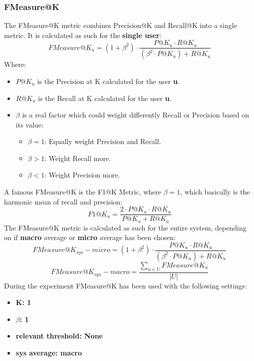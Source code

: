 \documentclass[11pt]{article}
\begin{document}
\subsubsection{FMeasure@K }\label{sec:f-meas-k}
The FMeasure@K metric combines Precision@K and Recall@K into a single metric.
It is calculated as such for the \textbf{single user}:
\hfill\break
\hfill\break
    \[
        FMeasure@K_u = (1 + \beta^2) \cdot \frac{P@K_u \cdot R@K_u}{(\beta^2 \cdot P@K_u) + R@K_u}
    \]
\hfill\break
\hfill\break
    Where:
\begin{itemize}
    \item $P@K_u$ is the Precision at K calculated for the user \textbf{u}.
    \item $R@K_u$ is the Recall at K calculated for the user \textbf{u}.
    \item $\beta$ is a real factor which could weight differently Recall or Precision based on its value:
    \begin{itemize}
        \item $\beta = 1$: Equally weight Precision and Recall.
        \item $\beta > 1$: Weight Recall more.
        \item $\beta < 1$: Weight Precision more.
    \end{itemize}
\end{itemize}
\hfill\break
\hfill\break
A famous FMeasure@K is the F1@K Metric, where $\beta = 1$, which basically is the harmonic mean of recall and
precision:
\hfill\break
\hfill\break
    \[
        F1@K_u = \frac{2 \cdot P@K_u \cdot R@K_u}{P@K_u + R@K_u}
    \]
\hfill\break
\hfill\break
The FMeasure@K metric is calculated as such for the entire system, depending on if \textbf{macro} average or
\textbf{micro} average has been chosen:
\hfill\break
\hfill\break
    \[
        FMeasure@K_{sys} - micro = (1 + \beta^2) \cdot \frac{P@K_u \cdot R@K_u}{(\beta^2 \cdot P@K_u) + R@K_u}
    \]
\hfill\break
\hfill\break
    \[
        FMeasure@K_{sys} - macro = \frac{\sum_{u \in U} FMeasure@K_u}{|U|}
    \]
\hfill\break
\hfill\break
During the experiment FMeasure@K has been used with the following settings:
\begin{itemize}
    \item \textbf{K: 1}
    \item  \textbf{$\beta$: 1}
    \item \textbf{relevant threshold: None }
    \item \textbf{sys average: macro }
\end{itemize}
\hfill\break
\hfill\break
\end{document}
